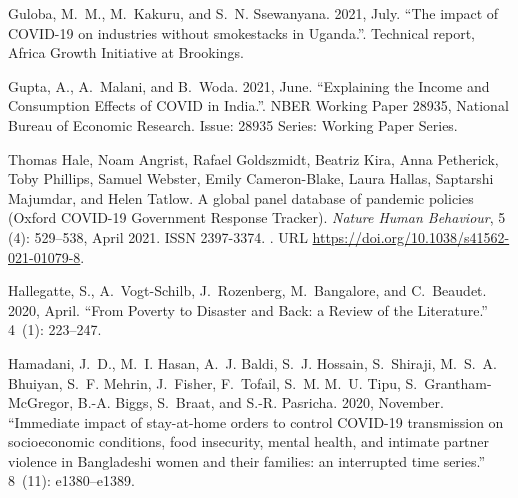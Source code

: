 \documentclass{wber}
\begin{document}
\begin{thebibliography}{}
Guloba, M.~M., M.~Kakuru, and S.~N. Ssewanyana. 2021, July.
\newblock ``The impact of {COVID}-19 on industries without smokestacks in
  {Uganda}.''.
\newblock Technical report, Africa Growth Initiative at Brookings.

Gupta, A., A.~Malani, and B.~Woda. 2021, June.
\newblock ``Explaining the {Income} and {Consumption} {Effects} of {COVID} in
  {India}.''.
\newblock NBER Working Paper 28935, National Bureau of Economic Research.
\newblock Issue: 28935 Series: Working Paper Series.

Thomas Hale, Noam Angrist, Rafael Goldszmidt, Beatriz Kira, Anna Petherick,
  Toby Phillips, Samuel Webster, Emily Cameron-Blake, Laura Hallas, Saptarshi
  Majumdar, and Helen Tatlow.
\newblock A global panel database of pandemic policies ({Oxford} {COVID}-19
  {Government} {Response} {Tracker}).
\newblock \emph{Nature Human Behaviour}, 5 (4): 529--538,
  April 2021.
\newblock ISSN 2397-3374.
\newblock {}.
\newblock URL \url{https://doi.org/10.1038/s41562-021-01079-8}.

Hallegatte, S., A.~Vogt-Schilb, J.~Rozenberg, M.~Bangalore, and C.~Beaudet.
  2020, April.
\newblock ``From {Poverty} to {Disaster} and {Back}: a {Review} of the
  {Literature}.''
~{ 4\/}~(1):
  223--247.

Hamadani, J.~D., M.~I. Hasan, A.~J. Baldi, S.~J. Hossain, S.~Shiraji, M.~S.~A.
  Bhuiyan, S.~F. Mehrin, J.~Fisher, F.~Tofail, S.~M. M.~U. Tipu,
  S.~Grantham-McGregor, B.-A. Biggs, S.~Braat, and S.-R. Pasricha. 2020,
  November.
\newblock ``Immediate impact of stay-at-home orders to control {COVID}-19
  transmission on socioeconomic conditions, food insecurity, mental health, and
  intimate partner violence in {Bangladeshi} women and their families: an
  interrupted time series.''
~{ 8\/}~(11): e1380--e1389.


\end{thebibliography}
\end{document}
